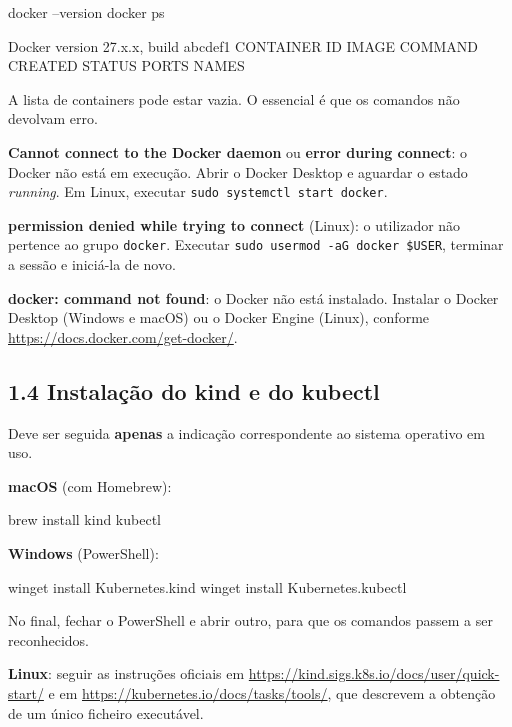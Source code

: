 \documentclass[11pt,a4paper]{article}
\newcommand{\cmd}[1]{\texttt{#1}}
\begin{document}
\begin{terminal}
docker --version
docker ps
\end{terminal}

\begin{saida}
Docker version 27.x.x, build abcdef1
CONTAINER ID   IMAGE   COMMAND   CREATED   STATUS   PORTS   NAMES
\end{saida}

A lista de containers pode estar vazia. O essencial é que os comandos não devolvam erro.

\begin{erro}
\textbf{Cannot connect to the Docker daemon} ou \textbf{error during connect}: o Docker não está em execução. Abrir o Docker Desktop e aguardar o estado \emph{running}. Em Linux, executar \cmd{sudo systemctl start docker}.

\textbf{permission denied while trying to connect} (Linux): o utilizador não pertence ao grupo \cmd{docker}. Executar \cmd{sudo usermod -aG docker \$USER}, terminar a sessão e iniciá-la de novo.

\textbf{docker: command not found}: o Docker não está instalado. Instalar o Docker Desktop (Windows e macOS) ou o Docker Engine (Linux), conforme \url{https://docs.docker.com/get-docker/}.
\end{erro}

\subsection*{1.4 Instalação do kind e do kubectl}

Deve ser seguida \textbf{apenas} a indicação correspondente ao sistema operativo em uso.

\textbf{macOS} (com Homebrew):

\begin{terminal}
brew install kind kubectl
\end{terminal}

\textbf{Windows} (PowerShell):

\begin{terminal}
winget install Kubernetes.kind
winget install Kubernetes.kubectl
\end{terminal}

No final, fechar o PowerShell e abrir outro, para que os comandos passem a ser reconhecidos.

\textbf{Linux}: seguir as instruções oficiais em \url{https://kind.sigs.k8s.io/docs/user/quick-start/} e em \url{https://kubernetes.io/docs/tasks/tools/}, que descrevem a obtenção de um único ficheiro executável.
\end{document}
